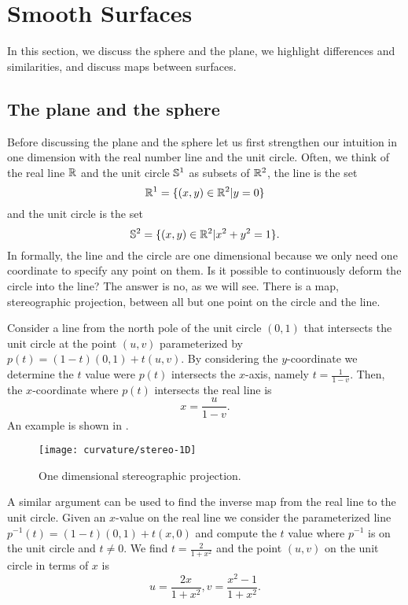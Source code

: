 \section{Smooth Surfaces}
\label{sec:smooth-surfaces}

In this section, we discuss the sphere and the plane, we highlight differences and similarities,
 and discuss maps between surfaces.

\subsection{The plane and the sphere}

Before discussing the plane and the sphere let us first strengthen our intuition in 
one dimension with the real number line and the unit circle.
Often, we think of the real line $\mathbb{R}$ and the unit circle $\mathbb{S}^1$ as subsets of $\mathbb{R}^2$,
the line is the set
$$\mathbb{R}^1=\{(x,y)\in \mathbb{R}^2 | y=0\}$$
and the unit circle is the set
$$\mathbb{S}^2=\{(x,y)\in \mathbb{R}^2 | x^2+y^2=1\}.$$
In formally, the line and the circle are one dimensional because
we only need one coordinate to specify any point on them.
Is it possible to continuously deform the circle into the line?
The answer is no, as we will see.
There is a map, stereographic projection, between all but one point on the circle
and the line.


Consider a line from the north pole of the unit circle $(0,1)$ that intersects
the unit circle at the point $(u,v)$ parameterized by $p(t)=(1-t)(0,1)+t(u,v).$
By considering the $y$-coordinate we determine the $t$ value were $p(t)$
intersects the $x$-axis, namely $t=\frac{1}{1-v}.$ Then, 
the $x$-coordinate where $p(t)$ intersects the real line is 
$$x=\frac{u}{1-v}.$$ An example is shown
in .

\begin{figure}[htb]
	\centering
	\texttt{[image: curvature/stereo-1D]}
	\caption{One dimensional stereographic projection.}
	\label{fig:stereo1D}
\end{figure}

A similar argument can be used to find the inverse map from
the real line to the unit circle. Given an $x$-value on the real line we consider
the parameterized line $p^{-1}(t)=(1-t)(0,1)+t(x,0)$ and compute
the $t$ value where $p^{-1}$ is on the unit circle and $t\neq 0.$ We find
$t=\frac{2}{1+x^2}$ and the point $(u,v)$ on the unit circle in terms of $x$ is
$$u=\frac{2x}{1+x^2}, v=\frac{x^2-1}{1+x^2}.$$

